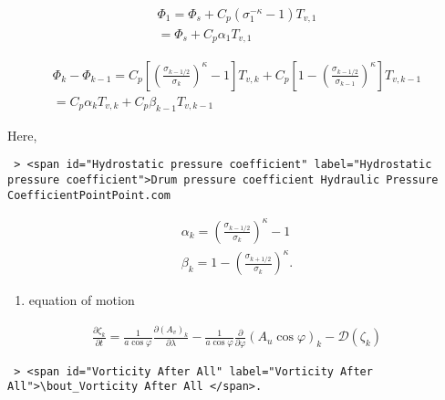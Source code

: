 \begin{eqnarray}
 \Phi_{1}  =  \Phi_{s} + C_{p} ( \sigma_{1}^{-\kappa} - 1  ) T_{v,1} \\
           =  \Phi_{s} + C_{p} \alpha_{1} T_{v,1} 
\end{eqnarray}

\begin{eqnarray}
 \Phi_k - \Phi_{k-1} 
   =  C_{p}
   \left[ \left( \frac{ \sigma_{k-1/2} }{ \sigma_k } \right)^{\kappa}
          - 1 \right] T_{v,k} 
       + C_{p}
   \left[ 1- 
         \left( \frac{ \sigma_{k-1/2} }{ \sigma_{k-1} } \right)^{\kappa}
              \right] T_{v,k-1} \\
   =    C_{p} \alpha_k T_{v,k} + C_{p} \beta_{k-1} T_{v,k-1}
\end{eqnarray}

Here,

\begin{verbatim}
 > <span id="Hydrostatic pressure coefficient" label="Hydrostatic pressure coefficient">Drum pressure coefficient Hydraulic Pressure CoefficientPointPoint.com
\end{verbatim}

\begin{eqnarray}
 \alpha_k   =  \left( \frac{ \sigma_{k-1/2} }
                               { \sigma_k } \right)^{\kappa} -1 \\
 \beta_k    =  1- \left( \frac{ \sigma_{k+1/2} }
                               { \sigma_k } \right)^{\kappa} .
\end{eqnarray}

\begin{enumerate}
\def\labelenumi{\arabic{enumi}.}
\setcounter{enumi}{2}
\tightlist
\item
  equation of motion
\end{enumerate}

\begin{eqnarray}
  \frac{\partial \zeta_k}{\partial t} 
        =   \frac{1}{a\cos\varphi} 
            \frac{\partial (A_v)_k}{\partial \lambda}
          - \frac{1}{a\cos\varphi} 
            \frac{\partial }{\partial \varphi} (A_u \cos\varphi)_k
          - {\mathcal D}(\zeta_k) 
\end{eqnarray}

\begin{verbatim}
 > <span id="Vorticity After All" label="Vorticity After All">\bout_Vorticity After All </span>.
 
\end{verbatim}

